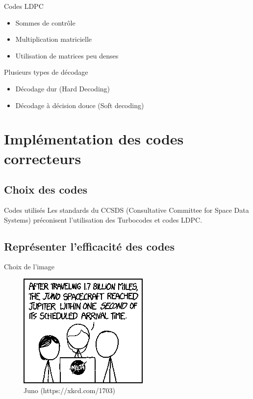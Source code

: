 \documentclass[11pt]{beamer}
\begin{document}
\begin{frame}{Codes LDPC}
	\begin{itemize}
		\item Sommes de contrôle
		\item Multiplication matricielle
		\item Utilisation de matrices peu denses
	\end{itemize}
\end{frame}

\begin{frame}{Plusieurs types de d\'ecodage}
	\begin{itemize}
		\item D\'ecodage dur (Hard Decoding)
		\item D\'ecodage \`a d\'ecision douce (Soft decoding)
	\end{itemize}
\end{frame}


\section{Impl\'ementation des codes correcteurs}
\subsection{Choix des codes}


\begin{frame}{Codes utilis\'es}
	Les standards du CCSDS (Consultative Committee for Space Data Systems) pr\'econisent l'utilisation des Turbocodes et codes LDPC.
\end{frame}


\subsection{Repr\'esenter l'efficacit\'e des codes}


\begin{frame}{Choix de l'image}
	\begin{figure}
		\includegraphics[scale=0.8]{base}
		\caption{Juno (https://xkcd.com/1703)}
	\end{figure}
\end{frame}
\end{document}
